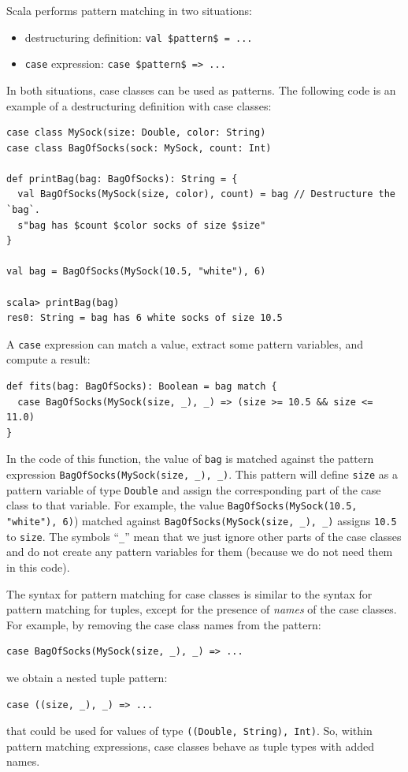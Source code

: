 Scala performs pattern matching in two situations:
\begin{itemize}
\item destructuring definition: \lstinline[mathescape=true]!val $pattern$ = ...!
\item \lstinline!case! expression: \lstinline[mathescape=true]!case $pattern$ => ...!
\end{itemize}
In both situations, case classes can be used as patterns. The following
code is an example of a destructuring definition with case classes:
\begin{lstlisting}
case class MySock(size: Double, color: String)
case class BagOfSocks(sock: MySock, count: Int)

def printBag(bag: BagOfSocks): String = {
  val BagOfSocks(MySock(size, color), count) = bag // Destructure the `bag`.
  s"bag has $count $color socks of size $size"
}

val bag = BagOfSocks(MySock(10.5, "white"), 6)

scala> printBag(bag)
res0: String = bag has 6 white socks of size 10.5
\end{lstlisting}

A \lstinline!case! expression can match a value, extract some pattern
variables, and compute a result:
\begin{lstlisting}
def fits(bag: BagOfSocks): Boolean = bag match {
  case BagOfSocks(MySock(size, _), _) => (size >= 10.5 && size <= 11.0)
}
\end{lstlisting}
In the code of this function, the value of \lstinline!bag! is matched
against the pattern expression \lstinline!BagOfSocks(MySock(size, _), _)!.
This pattern will define \lstinline!size! as a pattern variable of
type \lstinline!Double! and assign the corresponding part of the
case class to that variable. For example, the value \lstinline!BagOfSocks(MySock(10.5, "white"), 6)!)
matched against \lstinline!BagOfSocks(MySock(size, _), _)! assigns
\lstinline!10.5! to \lstinline!size!. The symbols \textsf{``}\lstinline!_!\textsf{''}
mean that we just ignore other parts of the case classes and do not
create any pattern variables for them (because we do not need them
in this code).

The syntax for pattern matching for case classes is similar to the
syntax for pattern matching for tuples, except for the presence of
\emph{names} of the case classes. For example, by removing the case
class names from the pattern:
\begin{lstlisting}
case BagOfSocks(MySock(size, _), _) => ...
\end{lstlisting}
we obtain a nested tuple pattern:
\begin{lstlisting}
case ((size, _), _) => ...
\end{lstlisting}
that could be used for values of type \lstinline!((Double, String), Int)!.
So, within pattern matching expressions, case classes behave as tuple
types with added names. 

